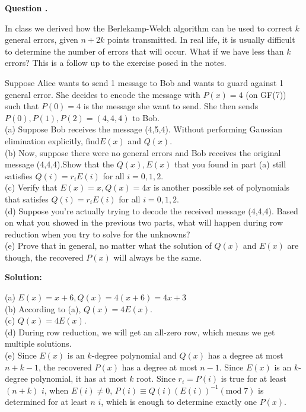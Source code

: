 \documentclass[12pt]{article}
\newcounter{questionnumber}
\newenvironment{question}[1][]{\stepcounter{questionnumber}\par\noindent\textbf{Question \thequestionnumber. #1}\par}{\par}
\newenvironment{solution}{\par\noindent\textbf{Solution:}\par}{\par\vspace{1em}}
\begin{document}
\begin{question}
    In class we derived how the Berlekamp-Welch algorithm can be used to correct $k$ general errors, given $n+2k$ points transmitted. In real life, it is usually difficult to determine the number of errors that will occur. What if we have less than $k$ errors? This is a follow up to the exercise posed in the notes.

    Suppose Alice wants to send 1 message to Bob and wants to guard against 1 general error. She decides to encode the message with $P(x)=4$ (on GF(7)) such that $P(0)=4$ is the message she want to send. She then sends $P(0),P(1),P(2)=(4,4,4)$ to Bob.\\
    (a) Suppose Bob receives the message (4,5,4). Without performing Gaussian elimination explicitly, find$E(x)$ and $Q(x).$\\
    (b) Now, suppose there were no general errors and Bob receives the original message (4,4,4).Show that the $Q(x),E(x)$ that you found in part (a) still satisfies $Q(i)=r_iE(i)$ for all $i=0,1,2.$\\
    (c) Verify that $E(x)=x,Q(x)=4x$ is another possible set of polynomials that satisfes $Q(i)=r_iE(i)$ for all $i=0,1,2.$\\
    (d) Suppose you're actually trying to decode the received message (4,4,4). Based on what you showed in the previous two parts, what will happen during row reduction when you try to solve for the unknowns?\\
    (e) Prove that in general, no matter what the solution of $Q(x)$ and $E(x)$ are though, the recovered $P(x)$ will always be the same.   
\end{question}
\begin{solution}
    \noindent
    (a) $E\left( x \right) =x+6,Q\left( x \right) =4\left( x+6 \right) =4x+3$\\
    (b) According to (a), $Q\left( x \right) =4E\left( x \right) $.\\
    (c) $Q\left( x \right) =4E\left( x \right) $. \\
    (d) During row reduction, we will get an all-zero row, which means we get multiple solutions.\\
    (e) Since $E(x)$ is an $k$-degree polynomial and $Q(x)$ has a degree at most $n+k-1$, the recovered $P(x)$ has a degree at most $n-1$.
    Since $E(x)$ is an $k$-degree polynomial, it has at most $k$ root. Since $r_i=P(i)$ is true for at least $(n+k)$ $i$, when $E(i)\neq 0$, $P\left( i \right) \equiv Q\left( i \right) \left( E\left( i \right) \right) ^{-1}\left( \mathrm{mod}\;7 \right) $ is determined for at least $n$ $i$, which is enough to determine exactly one $P(x)$.
\end{solution}
\end{document}
